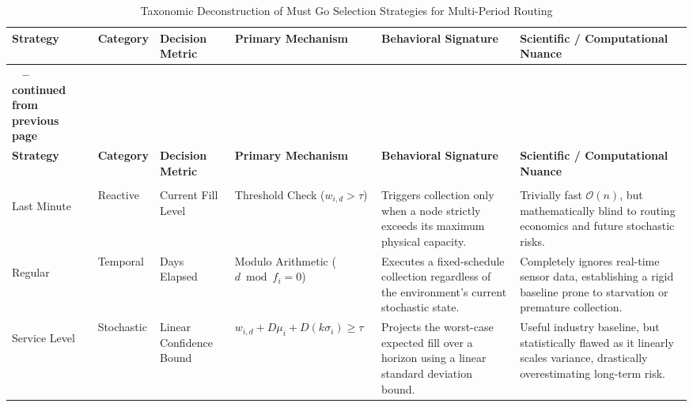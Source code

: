 \documentclass[10pt, a4paper]{article}
\begin{document}
\begin{center}
\scriptsize
\renewcommand{\arraystretch}{1.5}
\begin{longtable}{
  >{\raggedright\arraybackslash\bfseries}p{2.6cm}
  >{\raggedright\arraybackslash}p{2.2cm}
  >{\raggedright\arraybackslash}p{3.0cm}
  >{\raggedright\arraybackslash}p{3.5cm}
  >{\raggedright\arraybackslash}p{6.0cm}
  >{\raggedright\arraybackslash}p{6.0cm}
}
\caption{Taxonomic Deconstruction of Must Go Selection Strategies for Multi-Period Routing} \label{tab:selection_strategies_taxonomy} \\
\toprule
\normalfont\textbf{Strategy} & \normalfont\textbf{Category} & \normalfont\textbf{Decision Metric} & \normalfont\textbf{Primary Mechanism} & \normalfont\textbf{Behavioral Signature} & \normalfont\textbf{Scientific / Computational Nuance} \\ \midrule
\endfirsthead

\multicolumn{6}{c}%
{{\bfseries \tablename\ \thetable{} -- continued from previous page}} \\
\toprule
\normalfont\textbf{Strategy} & \normalfont\textbf{Category} & \normalfont\textbf{Decision Metric} & \normalfont\textbf{Primary Mechanism} & \normalfont\textbf{Behavioral Signature} & \normalfont\textbf{Scientific / Computational Nuance} \\ \midrule
\endhead

\midrule \multicolumn{6}{r}{{Continued on next page}} \\
\endfoot

\bottomrule
\endlastfoot

Last Minute & Reactive & Current Fill Level & Threshold Check ($w_{i,d} > \tau$) & Triggers collection only when a node strictly exceeds its maximum physical capacity. & Trivially fast $\mathcal{O}(n)$, but mathematically blind to routing economics and future stochastic risks. \\ \midrule

Regular & Temporal & Days Elapsed & Modulo Arithmetic ($d \bmod f_i = 0$) & Executes a fixed-schedule collection regardless of the environment's current stochastic state. & Completely ignores real-time sensor data, establishing a rigid baseline prone to starvation or premature collection. \\ \midrule

Service Level & Stochastic & Linear Confidence Bound & $w_{i,d} + D\mu_i + D(k\sigma_i) \ge \tau$ & Projects the worst-case expected fill over a horizon using a linear standard deviation bound. & Useful industry baseline, but statistically flawed as it linearly scales variance, drastically overestimating long-term risk. \\ \midrule


\end{longtable}
\end{center}
\end{document}
